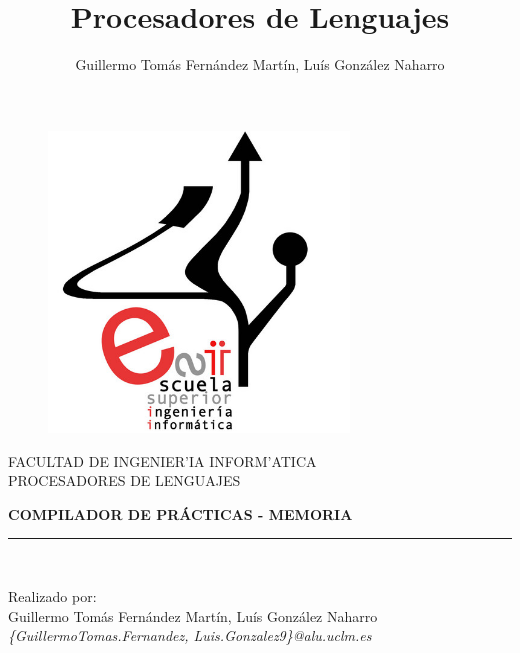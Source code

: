 \documentclass[11pt]{article}
\title{\textbf{Procesadores de Lenguajes}}
\author{Guillermo Tomás Fernández Martín, Luís González Naharro}
\begin{document}
\begin{titlepage}

\begin{center}
\vspace*{-1in}
\begin{figure}[htb]
\begin{center}
\includegraphics[width=8cm]{esiilogo.jpg}
\end{center}
\end{figure}

FACULTAD DE INGENIER'IA INFORM'ATICA\\
\vspace*{0.15in}
PROCESADORES DE LENGUAJES\\
\vspace*{0.15in}
\vspace*{0.2in}
\begin{Large}
\textbf{COMPILADOR DE PRÁCTICAS - MEMORIA} \\
\end{Large}
\vspace*{0.3in}

\rule{80mm}{0.1mm}\\
\vspace*{0.1in}
\vspace*{0.3in}
\begin{large}
Realizado por:\\ Guillermo Tomás Fernández Martín, Luís González Naharro\\
\textit{\{GuillermoTomas.Fernandez, Luis.Gonzalez9\}@alu.uclm.es}

\end{large}
\end{center}

\end{titlepage}
\thispagestyle{empty}
\vspace*{7in}
\end{document}
